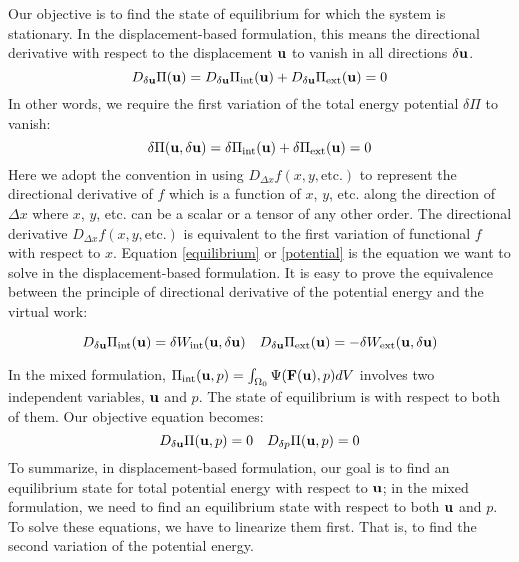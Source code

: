 Our objective is to find the state of equilibrium for which the system is stationary. In the displacement-based formulation, this means the directional derivative with respect to the displacement $\bold{u}$ to vanish in all directions $\delta{\bold{u}}$.
\begin{equation} \label{equilibrium}
D_{\delta\bold{u}}\Pi(\bold{u}) = D_{\delta\bold{u}}\Pi_\mathrm{int}(\bold{u}) + D_{\delta\bold{u}}\Pi_\mathrm{ext}(\bold{u}) = 0
\end{equation} 
In other words, we require the first variation of the total energy potential $\delta\Pi$ to vanish:
\begin{equation} \label{potential}
\delta\Pi(\bold{u}, \delta\bold{u}) =\delta\Pi_\mathrm{int}(\bold{u}) + \delta\Pi_\mathrm{ext}(\bold{u}) = 0
\end{equation}
Here we adopt the convention in \cite{Holzapfel} using $D_{\Delta{x}}f(x, y, \mathrm{etc.})$ to represent the directional derivative of $f$ which is a function of $x$, $y$, etc. along the direction of $\Delta{x}$ where $x$, $y$, etc. can be a scalar or a tensor of any other order. The directional derivative $D_{\Delta{x}}f(x, y, \mathrm{etc.})$ is equivalent to the first variation of functional $f$ with respect to $x$.
Equation \ref{equilibrium} or \ref{potential} is the equation we want to solve in the displacement-based formulation. It is easy to prove the equivalence between the principle of directional derivative of the potential energy and the virtual work:

\begin{equation}
D_{\delta\bold{u}}\Pi_\mathrm{int}(\bold{u}) = \delta W_\mathrm{int}(\bold{u}, \delta\bold{u}) \quad
D_{\delta\bold{u}}\Pi_\mathrm{ext}(\bold{u}) = - \delta W_\mathrm{ext}(\bold{u}, \delta\bold{u})
\end{equation}

In the mixed formulation, $\Pi_\mathrm{int}(\bold{u}, p) = \int_{\Omega_{0}}\Psi(\bold{F}(\bold{u}), p)dV$ involves two independent variables, $\bold{u}$ and $p$. The state of equilibrium is with respect to both of them. Our objective equation becomes:
\begin{equation} \label{target}
D_{\delta\bold{u}}\Pi(\bold{u}, p) = 0 \quad D_{\delta{p}}\Pi(\bold{u}, p) = 0
\end{equation}
To summarize, in displacement-based formulation, our goal is to find an equilibrium state for total potential energy with respect to $\bold{u}$; in the mixed formulation, we need to find an equilibrium state with respect to both $\bold{u}$ and $p$. To solve these equations, we have to linearize them first. That is, to find the second variation of the potential energy.



